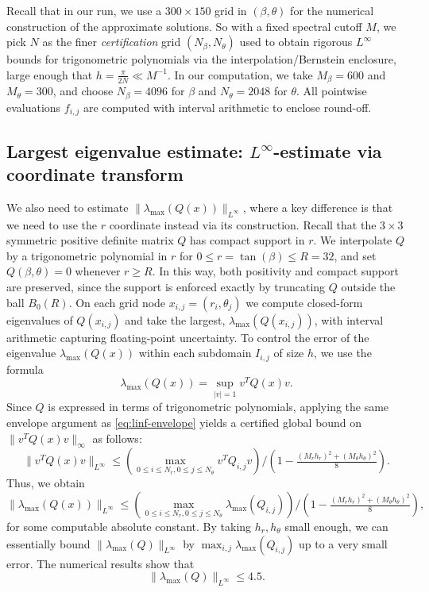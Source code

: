 \documentclass[11pt,a4paper]{article}
\numberwithin{equation}{section}
\begin{document}
Recall that in our run, we use a $300 \times 150$ grid in $(\beta, \theta)$ for the numerical construction of the
approximate solutions. So with a fixed
spectral cutoff $M$, we pick $N$ as the finer \emph{certification} grid
$(N_\beta,N_\theta)$ used to obtain rigorous $L^\infty$ bounds for trigonometric polynomials via the
interpolation/Bernstein enclosure, large enough that $h = \frac{\pi}{2 N} \ll
M^{- 1}$.  In our computation, we take $M_{\beta} = 600$ and $M_{\theta} = 300$, and choose $N_{\beta} = 4096$ for $\beta$ and $N_{\theta} = 2048$ for
$\theta$. All pointwise evaluations $f_{i, j}$ are computed with interval
arithmetic to enclose round-off.  





\subsection{Largest eigenvalue estimate: ${L^{\infty}}$-estimate via coordinate transform}\label{subsec:Q-envelope}

We also need to estimate $\| \lambda_{\max} (Q (x))
\|_{L^{\infty}}$, where a key difference is that we need to use the $r$ coordinate instead via its construction. Recall that the $3 \times 3$ symmetric positive definite
matrix $Q$ has compact support in $r$. We interpolate $Q$ by a trigonometric
polynomial in $r$ for $0 \leqslant r = \tan (\beta) \leqslant R = 32$, and
set $Q (\beta, \theta) = 0$ whenever $r \geqslant R$. In this way, both
positivity and compact support are preserved, since the support is enforced
exactly by truncating $Q$ outside the ball $B_0 (R)$. On each grid node $x_{i,
j} = (r_i, \theta_j)$ we compute closed-form eigenvalues of $Q (x_{i, j})$
and take the largest, $\lambda_{\max} (Q (x_{i, j}))$, with interval
arithmetic capturing floating-point uncertainty. To control the error of the
eigenvalue $\lambda_{\max} (Q (x))$ within each subdomain $I_{i, j}$ of size
$h$, we use the formula
\[ \lambda_{\max} (Q (x)) = \sup_{| v | = 1} v^T Q (x) v. \]
Since $Q$ is expressed in terms of trigonometric polynomials, applying the
same envelope argument as \eqref{eq:linf-envelope} yields a certified global
bound on $\|v^T Q (x) v\|_{\infty}$ as follows:
\[ \|v^T Q (x) v\|_{L^{\infty}} \leqslant (\max_{0 \leqslant i \leqslant
   N_{r}, 0 \leqslant j \leqslant N_{\theta}} v^T Q_{i, j} v) / \left( 1 -
   \tfrac{(M_{r} h_{r})^2 + (M_{\theta} h_{\theta})^2}{8} \right) . \]
Thus, we obtain
\[ \| \lambda_{\max} (Q (x))\|_{L^{\infty}} \leqslant (\max_{0 \leqslant i
   \leqslant N_{r}, 0 \leqslant j \leqslant N_{\theta}} \lambda_{\max}
   (Q_{i, j})) / \left( 1 - \tfrac{(M_{r} h_{r})^2 + (M_{\theta}
   h_{\theta})^2}{8} \right), \]
for some computable absolute constant. By taking $h_{r}, h_{\theta}$ small
enough, we can essentially bound $\| \lambda_{\max} (Q)\|_{L^{\infty}}$ by
$\max_{i, j} \lambda_{\max} (Q_{i, j})$ up to a very small error. The
numerical results show that
\[ \| \lambda_{\max} (Q)\|_{L^{\infty}} \leqslant 4.5. \]
\end{document}
